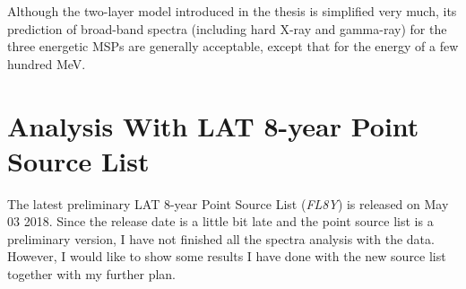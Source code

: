 \documentclass[12pt]{report}
\begin{document}
    Although the two-layer model introduced in the thesis is simplified very much, its prediction
    of broad-band spectra (including hard X-ray and gamma-ray) for the three energetic MSPs are 
    generally acceptable, except that for the energy of a few hundred MeV.
    
        
        
  
  \section{Analysis With LAT 8-year Point Source List}
    The latest preliminary LAT 8-year Point Source List (\textit{FL8Y}) is released 
    on May 03 2018. Since the release date is a little bit late and the point source list 
    is a preliminary version, I have not finished all the spectra analysis with the data.
    However, I would like to show some results I have done with the new source list
    together with my further plan.
\end{document}
